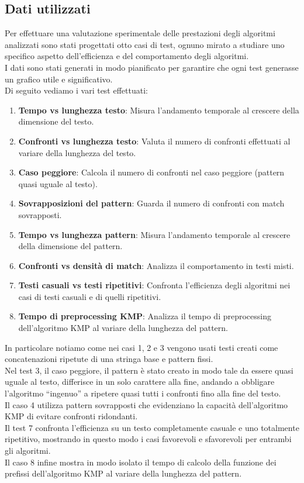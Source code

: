 \documentclass{article}
\begin{document}
\subsection{Dati utilizzati}
Per effettuare una valutazione sperimentale delle prestazioni degli algoritmi analizzati sono stati progettati otto casi di test, ognuno mirato a studiare uno specifico aspetto dell'efficienza e del comportamento degli algoritmi.\\
I dati sono stati generati in modo pianificato per garantire che ogni test generasse un grafico utile e significativo.\\
Di seguito vediamo i vari test effettuati:
\begin{enumerate}
    \item \textbf{Tempo vs lunghezza testo}: Misura l'andamento temporale al crescere della dimensione del testo.
    \item \textbf{Confronti vs lunghezza testo}: Valuta il numero di confronti effettuati al variare della lunghezza del testo.
    \item \textbf{Caso peggiore}: Calcola il numero di confronti nel caso peggiore (pattern quasi uguale al testo).
    \item \textbf{Sovrapposizioni del pattern}: Guarda il numero di confronti con match sovrapposti.
    \item \textbf{Tempo vs lunghezza pattern}: Misura l'andamento temporale al crescere della dimensione del pattern.
    \item \textbf{Confronti vs densità di match}: Analizza il comportamento in testi misti.
    \item \textbf{Testi casuali vs testi ripetitivi}: Confronta l'efficienza degli algoritmi nei casi di testi casuali e di quelli ripetitivi.
    \item \textbf{Tempo di preprocessing KMP}: Analizza il tempo di preprocessing dell'algoritmo KMP al variare della lunghezza del pattern.
\end{enumerate}
In particolare notiamo come nei casi 1, 2 e 3 vengono usati testi creati come concatenazioni ripetute di una stringa base e pattern fissi.\\
Nel test 3, il caso peggiore, il pattern è stato creato in modo tale da essere quasi uguale al testo, differisce in un solo carattere alla fine, andando a obbligare l'algoritmo ``ingenuo'' a ripetere quasi tutti i confronti fino alla fine del testo.\\
Il caso 4 utilizza pattern sovrapposti che evidenziano la capacità dell'algoritmo KMP di evitare confronti ridondanti.\\
Il test 7 confronta l'efficienza su un testo completamente casuale e uno totalmente ripetitivo, mostrando in questo modo i casi favorevoli e sfavorevoli per entrambi gli algoritmi.\\
Il caso 8 infine mostra in modo isolato il tempo di calcolo della funzione dei prefissi dell'algoritmo KMP al variare della lunghezza del pattern.\\
\end{document}
